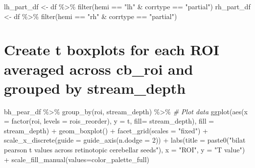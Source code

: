 \documentclass[
]{article}
\newenvironment{Shaded}{\begin{snugshade}}{\end{snugshade}}
\newcommand{\AttributeTok}[1]{\textcolor[rgb]{0.77,0.63,0.00}{#1}}
\newcommand{\CommentTok}[1]{\textcolor[rgb]{0.56,0.35,0.01}{\textit{#1}}}
\newcommand{\DecValTok}[1]{\textcolor[rgb]{0.00,0.00,0.81}{#1}}
\newcommand{\FunctionTok}[1]{\textcolor[rgb]{0.00,0.00,0.00}{#1}}
\newcommand{\NormalTok}[1]{#1}
\newcommand{\OtherTok}[1]{\textcolor[rgb]{0.56,0.35,0.01}{#1}}
\newcommand{\SpecialCharTok}[1]{\textcolor[rgb]{0.00,0.00,0.00}{#1}}
\newcommand{\StringTok}[1]{\textcolor[rgb]{0.31,0.60,0.02}{#1}}
\begin{document}
\begin{Shaded}
\begin{Highlighting}[]
\NormalTok{lh\_part\_df }\OtherTok{\textless{}{-}}\NormalTok{ df }\SpecialCharTok{\%\textgreater{}\%} \FunctionTok{filter}\NormalTok{(hemi }\SpecialCharTok{==} \StringTok{"lh"} \SpecialCharTok{\&}\NormalTok{ corrtype }\SpecialCharTok{==} \StringTok{"partial"}\NormalTok{)}
\NormalTok{rh\_part\_df }\OtherTok{\textless{}{-}}\NormalTok{ df }\SpecialCharTok{\%\textgreater{}\%} \FunctionTok{filter}\NormalTok{(hemi }\SpecialCharTok{==} \StringTok{"rh"} \SpecialCharTok{\&}\NormalTok{ corrtype }\SpecialCharTok{==} \StringTok{"partial"}\NormalTok{)}
\end{Highlighting}
\end{Shaded}

\hypertarget{create-t-boxplots-for-each-roi-averaged-across-cb_roi-and-grouped-by-stream_depth}{%
\section{Create t boxplots for each ROI averaged across cb\_roi and
grouped by
stream\_depth}\label{create-t-boxplots-for-each-roi-averaged-across-cb_roi-and-grouped-by-stream_depth}}

\begin{Shaded}
\begin{Highlighting}[]
\NormalTok{bh\_pear\_df }\SpecialCharTok{\%\textgreater{}\%}
  \FunctionTok{group\_by}\NormalTok{(roi, stream\_depth) }\SpecialCharTok{\%\textgreater{}\%}
\CommentTok{\# Plot data}
  \FunctionTok{ggplot}\NormalTok{(}\FunctionTok{aes}\NormalTok{(}\AttributeTok{x =} \FunctionTok{factor}\NormalTok{(roi, }\AttributeTok{levels =}\NormalTok{ rois\_reorder), }\AttributeTok{y =}\NormalTok{ t, }\AttributeTok{fill=}\NormalTok{ stream\_depth), }\AttributeTok{fill =}\NormalTok{ stream\_depth) }\SpecialCharTok{+}
  \FunctionTok{geom\_boxplot}\NormalTok{() }\SpecialCharTok{+}
  \FunctionTok{facet\_grid}\NormalTok{(}\AttributeTok{scales =} \StringTok{"fixed"}\NormalTok{) }\SpecialCharTok{+}
  \FunctionTok{scale\_x\_discrete}\NormalTok{(}\AttributeTok{guide =} \FunctionTok{guide\_axis}\NormalTok{(}\AttributeTok{n.dodge =} \DecValTok{2}\NormalTok{)) }\SpecialCharTok{+}
  \FunctionTok{labs}\NormalTok{(}\AttributeTok{title =} \FunctionTok{paste0}\NormalTok{(}\StringTok{"bilat pearson t values across retinotopic cerebellar seeds"}\NormalTok{),}
       \AttributeTok{x =} \StringTok{"ROI"}\NormalTok{,}
       \AttributeTok{y =} \StringTok{"T value"}\NormalTok{) }\SpecialCharTok{+}
  \FunctionTok{scale\_fill\_manual}\NormalTok{(}\AttributeTok{values=}\NormalTok{color\_palette\_full)}
\end{Highlighting}
\end{Shaded}
\end{document}
